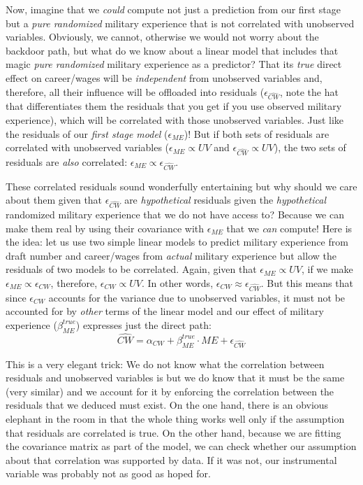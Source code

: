\documentclass[
]{book}
\begin{document}
Now, imagine that we \emph{could} compute not just a prediction from our first stage but a \emph{pure randomized} military experience that is not correlated with unobserved variables. Obviously, we cannot, otherwise we would not worry about the backdoor path, but what do we know about a linear model that includes that magic \emph{pure randomized} military experience as a predictor? That its \emph{true} direct effect on career/wages will be \emph{independent} from unobserved variables and, therefore, all their influence will be offloaded into residuals (\(\epsilon_{\widehat{CW}}\), note the hat that differentiates them the residuals that you get if you use observed military experience), which will be correlated with those unobserved variables. Just like the residuals of our \emph{first stage model} (\(\epsilon_{ME}\))! But if both sets of residuals are correlated with unobserved variables (\(\epsilon_{ME} \propto UV\) and \(\epsilon_{\widehat{CW}} \propto UV\)), the two sets of residuals are \emph{also} correlated: \(\epsilon_{ME} \propto \epsilon_{\widehat{CW}}\).

These correlated residuals sound wonderfully entertaining but why should we care about them given that \(\epsilon_{\widehat{CW}}\) are \emph{hypothetical} residuals given the \emph{hypothetical} randomized military experience that we do not have access to? Because we can make them real by using their covariance with \(\epsilon_{ME}\) that we \emph{can} compute! Here is the idea: let us use two simple linear models to predict military experience from draft number and career/wages from \emph{actual} military experience but allow the residuals of two models to be correlated. Again, given that \(\epsilon_{ME} \propto UV\), if we make \(\epsilon_{ME} \propto \epsilon_{CW}\), therefore, \(\epsilon_{CW} \propto UV\). In other words, \(\epsilon_{CW} \approx \epsilon_{\widehat{CW}}\). But this means that since \(\epsilon_{CW}\) accounts for the variance due to unobserved variables, it must not be accounted for by \emph{other} terms of the linear model and our effect of military experience (\(\beta^{true}_{ME}\)) expresses just the direct path:
\[\widehat{CW} = \alpha_{CW} + \beta^{true}_{ME} \cdot ME + \epsilon_{\widehat{CW}}\]

This is a very elegant trick: We do not know what the correlation between residuals and unobserved variables is but we do know that it must be the same (very similar) and we account for it by enforcing the correlation between the residuals that we deduced must exist. On the one hand, there is an obvious elephant in the room in that the whole thing works well only if the assumption that residuals are correlated is true. On the other hand, because we are fitting the covariance matrix as part of the model, we can check whether our assumption about that correlation was supported by data. If it was not, our instrumental variable was probably not as good as hoped for.
\end{document}
